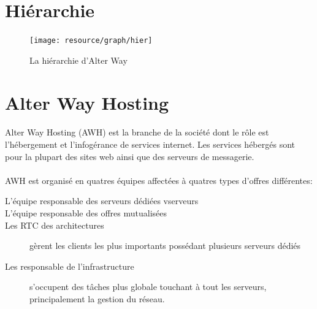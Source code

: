 \section{Hiérarchie}

\begin{figure}[H]
	\centering
	\texttt{[image: resource/graph/hier]}
	\caption{La hiérarchie d'Alter Way}
\end{figure}


\section{Alter Way Hosting}
\paragraph*{}
Alter Way Hosting (AWH) est la branche de la société dont le rôle est l'hébergement et l'infogérance de services internet.
Les services hébergés sont pour la plupart des sites web ainsi que des serveurs de messagerie.

\paragraph*{}
AWH est organisé en quatres équipes affectées à quatres types d'offres différentes:

\begin{description}
	\item[L'équipe responsable des serveurs dédiées vserveurs \footnotemark]
	\item[L'équipe responsable des offres mutualisées
		\footnotemark] 
	\item[Les RTC \footnotemark des architectures] 
		gèrent les clients les plus importants possédant plusieurs serveurs dédiés
	\item[Les responsable de l'infrastructure] s'occupent des tâches plus globale touchant à tout les serveurs,
		principalement la gestion du réseau.



\end{description}


